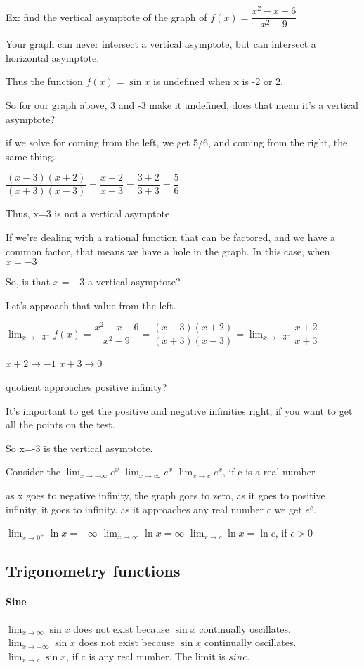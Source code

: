 \documentclass[12pt]{article}
\begin{document}
Ex: find the vertical asymptote of the graph of $f(x) = \dfrac{x^2-x-6}{x^2-9}$

Your graph can never intersect a vertical asymptote, but can intersect a horizontal asymptote.

Thus the function $f(x)=\sin x$ is undefined when x is -2 or 2.

So for our graph above, 3 and -3 make it undefined, does that mean it's a vertical asymptote?

if we solve for coming from the left, we get 5/6, and coming from the right, the same thing.

$\dfrac{(x-3)(x+2)}{(x+3)(x-3)} = \dfrac{x+2}{x+3} = \dfrac{3+2}{3+3}= \dfrac{5}{6}$

Thus, x=3 is not a vertical asymptote.

If we're dealing with a rational function that can be factored, and we have a common factor, that means we
have a hole in the graph. In this case, when $x=-3$

So, is that $x=-3$ a vertical asymptote?

Let's approach that value from the left.

$\lim_{x\to -3^-}f(x) = \dfrac{x^2-x-6}{x^2-9} = \dfrac{(x-3)(x+2)}{(x+3)(x-3)}= \lim_{x\to
  -3^-}\dfrac{x+2}{x+3}$

$x+2\to-1$
$x+3\to0^-$

quotient approaches positive infinity?

It's important to get the positive and negative infinities right, if you want to get all the points on the
test.

So x=-3 is the vertical asymptote.

Consider the
 $\lim_{x\to-\infty}e^x$
$\lim_{x\to\infty}e^x$
$\lim_{x\to c}e^x$, if c is a real number

as x goes to negative infinity, the graph goes to zero, as it goes to positive infinity, it goes to
infinity. as it approaches any real number $c$ we get $e^c$.

$\lim_{x\to0^+}\ln x = -\infty$
$\lim_{x\to\infty}\ln x = \infty$
$\lim_{x\to c}\ln x = \ln c$, if $c > 0$

\subsection{Trigonometry functions}
\paragraph{Sine}
$\lim_{x\to\infty}\sin x$ does not exist because $\sin x$ continually oscillates.
$\lim_{x\to-\infty}\sin x$ does not exist because $\sin x$ continually oscillates.
$\lim_{x\to c}\sin x$, if c is any real number. The limit is $sin c$.
\end{document}
